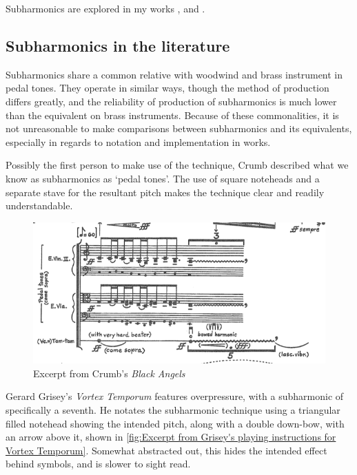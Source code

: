 Subharmonics are explored in my works , and .


\subsection{Subharmonics in the literature}

Subharmonics share a common relative with woodwind and brass instrument in pedal tones.
They operate in similar ways, though the method of production differs greatly, and the reliability of production of subharmonics is much lower than the equivalent on brass instruments.
Because of these commonalities, it is not unreasonable to make comparisons between subharmonics and its equivalents, especially in regards to notation and implementation in works.

Possibly the first person to make use of the technique, Crumb described what we know as subharmonics as `pedal tones'.\autocite{crumbBlackAngelsImages1971} 
The use of square noteheads and a separate stave for the resultant pitch makes the technique clear and readily understandable.\autocite[]{crumbBlackAngels1995}
\begin{figure}
    \includegraphics[width=\linewidth]{./resources/crumbBlackAngels.png}
    \caption{Excerpt from Crumb's \emph{Black Angels}}
    \label{fig:Excerpt from Crumb's Black Angels}
\end{figure}



Gerard Grisey's \emph{Vortex Temporum} features overpressure, with a subharmonic of specifically a seventh.\autocite[]{griseyVortexTemporum}
He notates the subharmonic technique using a triangular filled notehead showing the intended pitch, along with a double down-bow, with an arrow above it, shown in \autoref{fig:Excerpt from Grisey's playing instructions for Vortex Temporum}. 
Somewhat abstracted out, this hides the intended effect behind symbols, and is slower to sight read.


